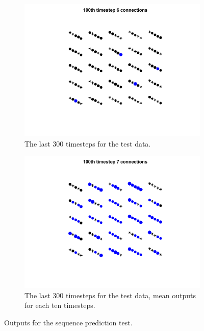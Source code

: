 \begin{figure}
    \centering
    \begin{subfigure}[b]{0.4\textwidth}
        \includegraphics[width=\textwidth]{Images/pool_6_100.png}
        \caption{The last 300 timesteps for the test data.}
    \label{fig:result}
    \end{subfigure}
    \begin{subfigure}[b]{0.4\textwidth}
        \includegraphics[width=\textwidth]{Images/pool_7_100.png}
        \caption{The last 300 timesteps for the test data, mean outputs for each ten timesteps.}
    \label{fig:resultMean}
    \end{subfigure}
    \caption{Outputs for the sequence prediction test.}
\end{figure}










